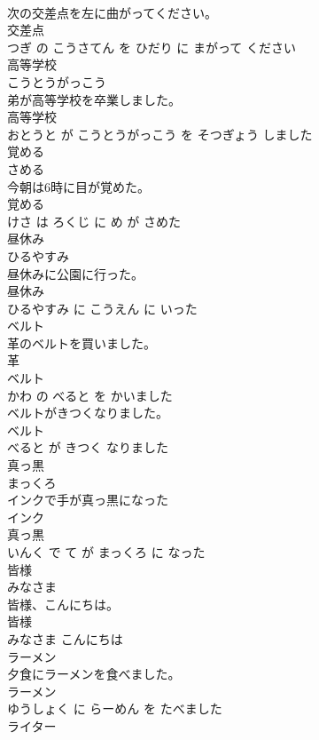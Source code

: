 \documentclass[8pt]{extreport}
\begin{document}
\begin{CJK}{UTF8}{min}
\\	次の交差点を左に曲がってください。	
\\	交差点 
\\	つぎ の こうさてん を ひだり に まがって ください			
\\	高等学校	
\\	こうとうがっこう			
\\	弟が高等学校を卒業しました。	
\\	高等学校 
\\	おとうと が こうとうがっこう を そつぎょう しました			
\\	覚める	
\\	さめる			
\\	今朝は6時に目が覚めた。	
\\	覚める 
\\	けさ は ろくじ に め が さめた			
\\	昼休み	
\\	ひるやすみ			
\\	昼休みに公園に行った。	
\\	昼休み 
\\	ひるやすみ に こうえん に いった			
\\	ベルト	
\\	革のベルトを買いました。	
\\	革 
\\	ベルト 
\\	かわ の べると を かいました			
\\	ベルトがきつくなりました。	
\\	ベルト 
\\	べると が きつく なりました			
\\	真っ黒	
\\	まっくろ			
\\	インクで手が真っ黒になった	
\\	インク 
\\	真っ黒 
\\	いんく で て が まっくろ に なった			
\\	皆様	
\\	みなさま			
\\	皆様、こんにちは。	
\\	皆様 
\\	みなさま こんにちは			
\\	ラーメン	
\\	夕食にラーメンを食べました。	
\\	ラーメン 
\\	ゆうしょく に らーめん を たべました			
\\	ライター	

\end{CJK}
\end{document}
